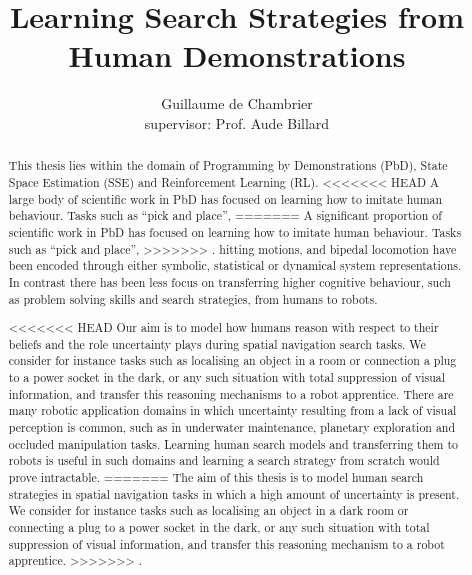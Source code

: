 \documentclass[a4paper,10pt]{article}
\title{Learning Search Strategies from Human Demonstrations}
\author[]{Guillaume de Chambrier\\supervisor: Prof. Aude Billard}
\affil[]{École Polytechnique Fédérale de Lausanne (EPFL), LASA}
\begin{document}
\maketitle

\begin{abstract}
 
This thesis lies within the domain of Programming by Demonstrations (PbD), State Space Estimation (SSE) and Reinforcement Learning (RL). 
<<<<<<< HEAD
A large body of scientific work in PbD has focused on learning how to imitate human behaviour. Tasks such as ``pick and place'', 
=======
A significant proportion of scientific work in PbD has focused on learning how to imitate human behaviour. Tasks such as ``pick and place'', 
>>>>>>> .
hitting motions, and bipedal locomotion have been encoded through either symbolic, statistical or dynamical system representations. 
In contrast there has been less focus on transferring higher cognitive behaviour, such as problem solving skills and search strategies,
from humans to robots. 

<<<<<<< HEAD
Our aim is to model how humans reason with respect to their beliefs and the role uncertainty plays during spatial navigation search tasks. 
We consider for instance tasks such as localising  an object in a room or connection a plug to a power socket in the dark, 
or any such situation with total suppression of visual information, and transfer this reasoning mechanisms to a robot apprentice. 
There are many robotic application domains in which uncertainty resulting from a lack of visual perception is common, such as in underwater 
maintenance, planetary exploration and occluded manipulation tasks. Learning human search models and transferring them to robots is useful
in such domains and learning a search strategy from scratch would prove intractable.
=======
The aim of this thesis is to model human search strategies in spatial navigation tasks in which a high amount of uncertainty is present.
We consider for instance tasks such as localising  an object in a dark room or connecting a plug to a power socket in the dark, 
or any such situation with total suppression of visual information, and transfer this reasoning mechanism to a robot apprentice. 
>>>>>>> .


\end{abstract}
\end{document}
